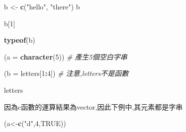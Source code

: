 \documentclass[]{book}
\newenvironment{Shaded}{\begin{snugshade}}{\end{snugshade}}
\newcommand{\CommentTok}[1]{\textcolor[rgb]{0.56,0.35,0.01}{\textit{#1}}}
\newcommand{\DataTypeTok}[1]{\textcolor[rgb]{0.13,0.29,0.53}{#1}}
\newcommand{\DecValTok}[1]{\textcolor[rgb]{0.00,0.00,0.81}{#1}}
\newcommand{\KeywordTok}[1]{\textcolor[rgb]{0.13,0.29,0.53}{\textbf{#1}}}
\newcommand{\NormalTok}[1]{#1}
\newcommand{\OperatorTok}[1]{\textcolor[rgb]{0.81,0.36,0.00}{\textbf{#1}}}
\newcommand{\OtherTok}[1]{\textcolor[rgb]{0.56,0.35,0.01}{#1}}
\newcommand{\StringTok}[1]{\textcolor[rgb]{0.31,0.60,0.02}{#1}}
\theoremstyle{definition}
\theoremstyle{definition}
\theoremstyle{definition}
\theoremstyle{remark}
\begin{document}
\begin{Shaded}
\begin{Highlighting}[]
\NormalTok{b <-}\StringTok{ }\KeywordTok{c}\NormalTok{(}\StringTok{"hello"}\NormalTok{, }\StringTok{"there"}\NormalTok{)}
\NormalTok{b}
\end{Highlighting}
\end{Shaded}

\begin{Shaded}
\begin{Highlighting}[]
\NormalTok{b[}\DecValTok{1}\NormalTok{]}
\end{Highlighting}
\end{Shaded}

\begin{Shaded}
\begin{Highlighting}[]
\KeywordTok{typeof}\NormalTok{(b)}
\end{Highlighting}
\end{Shaded}

\begin{Shaded}
\begin{Highlighting}[]
\NormalTok{(}\DataTypeTok{a =} \KeywordTok{character}\NormalTok{(}\DecValTok{5}\NormalTok{)) }\CommentTok{# 產生5個空白字串}
\end{Highlighting}
\end{Shaded}

\begin{Shaded}
\begin{Highlighting}[]
\NormalTok{(}\DataTypeTok{b =}\NormalTok{ letters[}\DecValTok{1}\OperatorTok{:}\DecValTok{4}\NormalTok{]) }\CommentTok{# 注意,letters不是函數}
\end{Highlighting}
\end{Shaded}

\begin{Shaded}
\begin{Highlighting}[]
\NormalTok{letters}
\end{Highlighting}
\end{Shaded}

因為c函數的運算結果為vector,因此下例中,其元素都是字串

\begin{Shaded}
\begin{Highlighting}[]
\NormalTok{ (a<-}\KeywordTok{c}\NormalTok{(}\StringTok{"d"}\NormalTok{,}\DecValTok{4}\NormalTok{,}\OtherTok{TRUE}\NormalTok{))}
\end{Highlighting}
\end{Shaded}
\end{document}
